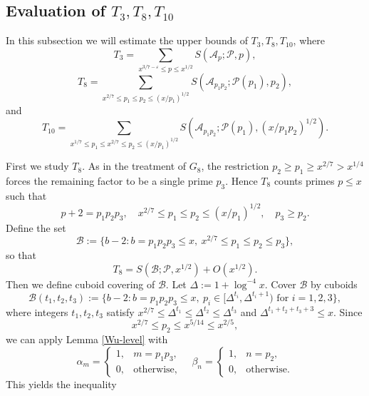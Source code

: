\documentclass[12pt, a4paper]{amsart}
\def\leq{\leqslant}
\def\le{\leqslant}
\def\ge{\geqslant}
\theoremstyle{plain}
\theoremstyle{remark}
\numberwithin{equation}{section}
\begin{document}
	
\subsection{Evaluation of $T_3,T_8,T_{10}$}
In this subsection we will estimate the upper bounds of $T_3,T_8,T_{10}$, where
\[
T_3 =\sum\limits_{x^{3/7-\varepsilon}\le p\le x^{1/2}}S(\mathscr{A}_p ; \mathscr{P}, p), 
\]
\[
T_8 = \sum_{x^{2/7} \leq p_1 \le p_2 \le (x/p_1)^{1/2}} S(\mathscr{A}_{p_1 p_2}; \mathscr{P}(p_1), p_2),
\] 
and 
\[	
T_{10} = \sum_{x^{1/7} \leq p_1 \le x^{2/7} \leq p_2 \le (x/p_1)^{1/2}} S(\mathscr{A}_{p_1 p_2}; \mathscr{P}( p_1), (x/p_1 p_2)^{1/2}).
\] 

First we study \(T_8\).  
As in the treatment of \(G_8\), the restriction \(p_2 \ge p_1 \ge x^{2/7} > x^{1/4}\) forces the remaining factor to be a single prime \(p_3\).  
Hence \(T_8\) counts primes \(p \le x\) such that  
\[ 
p + 2 = p_1 p_2 p_3, \quad x^{2/7} \le p_1 \le p_2 \le (x/p_1)^{1/2}, \quad p_3 \ge p_2. 
\] 
Define the set  
\begin{equation}
\mathscr{B} := \{ b - 2 : b = p_1 p_2 p_3 \le x,\ x^{2/7} \le p_1 \le  p_2 \le p_3 \}, 
\end{equation}
so that  
\begin{equation}
T_8 = S(\mathscr{B}; \mathscr{P}, x^{1/2}) + O(x^{1/2}). 
\end{equation}
Then we define cuboid covering of $\mathscr{B}$. Let $\Delta := 1 + \log^{-4} x$. Cover $\mathscr{B}$ by cuboids
\begin{equation}
\mathscr{B}(t_1, t_2, t_3) 
:= \{ b - 2 : 
b = p_1 p_2 p_3 \leqslant x,\ p_i 
\in [ \Delta^{t_i}, \Delta^{t_i + 1} ) \text{ for } i=1, 2, 3\},
\end{equation}
where integers $t_1, t_2, t_3$ satisfy $x^{2/7} \leqslant \Delta^{t_1} \leqslant \Delta^{t_2} \leqslant \Delta^{t_3}$ and $\Delta^{t_1 + t_2 + t_3 + 3} \leqslant x$. 
Since
$$
x^{2/7} \leqslant p_2 \leqslant x^{5/14} \leqslant x^{2/5},
$$ 
we can apply Lemma \ref{Wu-level} with  
\begin{equation}
\alpha_m 
= \begin{cases} 1, & m = p_1 p_3, \\ 
0, & \text{otherwise}, 
\end{cases} 
\quad \beta_n 
= \begin{cases} 1, & n = p_2, \\ 
0, & \text{otherwise}. 
\end{cases}
\end{equation}
This	yields the inequality
\end{document}

